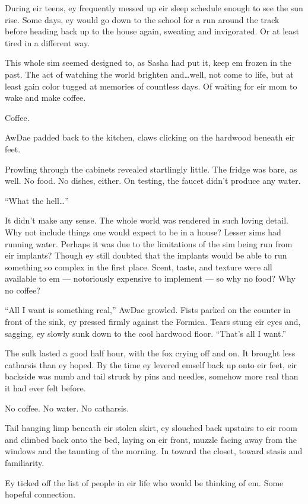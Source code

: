 During eir teens, ey frequently messed up eir sleep schedule enough to see the sun rise. Some days, ey would go down to the school for a run around the track before heading back up to the house again, sweating and invigorated. Or at least tired in a different way.

This whole sim seemed designed to, as Sasha had put it, keep em frozen in the past. The act of watching the world brighten and\ldots{}well, not come to life, but at least gain color tugged at memories of countless days. Of waiting for eir mom to wake and make coffee.

Coffee.

AwDae padded back to the kitchen, claws clicking on the hardwood beneath eir feet.

Prowling through the cabinets revealed startlingly little. The fridge was bare, as well. No food. No dishes, either. On testing, the faucet didn't produce any water.

``What the hell\ldots{}''

It didn't make any sense. The whole world was rendered in such loving detail. Why not include things one would expect to be in a house? Lesser sims had running water. Perhaps it was due to the limitations of the sim being run from eir implants? Though ey still doubted that the implants would be able to run something so complex in the first place. Scent, taste, and texture were all available to em — notoriously expensive to implement — so why no food? Why no coffee?

``All I want is something real,'' AwDae growled. Fists parked on the counter in front of the sink, ey pressed firmly against the Formica. Tears stung eir eyes and, sagging, ey slowly sunk down to the cool hardwood floor. ``That's all I want.''

The sulk lasted a good half hour, with the fox crying off and on. It brought less catharsis than ey hoped. By the time ey levered emself back up onto eir feet, eir backside was numb and tail struck by pins and needles, somehow more real than it had ever felt before.

No coffee. No water. No catharsis.

Tail hanging limp beneath eir stolen skirt, ey slouched back upstairs to eir room and climbed back onto the bed, laying on eir front, muzzle facing away from the windows and the taunting of the morning. In toward the closet, toward stasis and familiarity.

Ey ticked off the list of people in eir life who would be thinking of em. Some hopeful connection.

